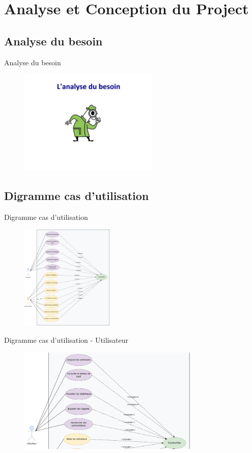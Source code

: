 \section{Analyse et Conception du Project}
\subsection{Analyse du besoin}
\begin{frame}{Analyse du besoin}
    \begin{figure}[H]
        \centering
        \includegraphics[height=5cm]{assets/images/analyse-besoin.jpg}
    \end{figure}

\end{frame}

\subsection{Digramme cas d'utilisation}
\begin{frame}{Digramme cas d'utilisation}
    \begin{figure}[H]
        \centering
        \includegraphics[height=5cm]{assets/images/usecase.png}
    \end{figure}
\end{frame}
\begin{frame}{Digramme cas d'utilisation - Utilisateur}
    \begin{figure}[H]
        \centering
        \includegraphics[height=5cm]{assets/images/usecase-user.png}
    \end{figure}
\end{frame}

